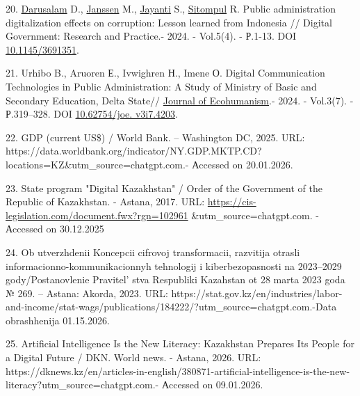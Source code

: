 \begin{refs}
20. \href{https://www.researchgate.net/scientific-contributions/Darusalam-Darusalam-2146395918?_tp=eyJjb250ZXh0Ijp7ImZpcnN0UGFnZSI6ImNpdGF0aW9uRG93bmxvYWQiLCJwYWdlIjoicHVibGljYXRpb24ifX0}{Darusalam}
D.,
\href{https://www.researchgate.net/profile/Marijn-Janssen?_tp=eyJjb250ZXh0Ijp7ImZpcnN0UGFnZSI6ImNpdGF0aW9uRG93bmxvYWQiLCJwYWdlIjoicHVibGljYXRpb24ifX0}{Janssen}
M.,
\href{https://www.researchgate.net/scientific-contributions/Sri-Delasmi-Jayanti-2236563283}{Jayanti}
S.,
\href{https://www.researchgate.net/scientific-contributions/Renato-Sitompul-2229051296?_tp=eyJjb250ZXh0Ijp7ImZpcnN0UGFnZSI6ImNpdGF0aW9uRG93bmxvYWQiLCJwYWdlIjoicHVibGljYXRpb24ifX0}{Sitompul}
R. Public administration digitalization effects on corruption: Lesson
learned from Indonesia // Digital Government: Research and Practice.-
2024. - Vol.5(4). - Р.1-13. DOI
\href{https://doi.org/10.1145/3691351}{10.1145/3691351}.

21. Urhibo B., Aruoren Е., Ivwighren Н., Imene О. Digital Communication
Technologies in Public Administration: A Study of Ministry of Basic and
Secondary Education, Delta State//
\href{https://www.researchgate.net/journal/Journal-of-Ecohumanism-2752-6801?_tp=eyJjb250ZXh0Ijp7ImZpcnN0UGFnZSI6ImNpdGF0aW9uRG93bmxvYWQiLCJwYWdlIjoicHVibGljYXRpb24ifX0}{Journal
of Ecohumanism}.- 2024. - Vol.3(7). - Р.319--328. DOI
\href{https://doi.org/10.62754/joe.v3i7.4203}{10.62754/joe. v3i7.4203}.

22. GDP (current US\$) / World Bank. -- Washington DC, 2025. URL:
https://data.worldbank.org/indicator/NY.GDP.MKTP.CD?locations=KZ\&utm\_source=chatgpt.com.-
Аccessed on 20.01.2026.

23. State program "Digital Kazakhstan" / Order of the Government of the
Republic of Kazakhstan. - Astana, 2017. URL:
\url{https://cis-legislation.com/document.fwx?rgn=102961}
\&utm\_source=chatgpt.com. - Аccessed on 30.12.2025

24. Ob utverzhdenii Koncepcii cifrovoj transformacii, razvitija otrasli
informacionno-kommunikacionnyh tehnologij i kiberbezopasnosti na
2023--2029 gody/Postanovlenie Pravitel' stva Respubliki
Kazahstan ot 28 marta 2023 goda № 269. -- Astana: Akorda, 2023. URL:
https://stat.gov.kz/en/industries/labor-and-income/stat-wags/publications/184222/?utm\_source=chatgpt.com.-Data
obrashhenija 01.15.2026.

25. Artificial Intelligence Is the New Literacy: Kazakhstan Prepares Its
People for a Digital Future / DKN. World news. - Astana, 2026. URL:
https://dknews.kz/en/articles-in-english/380871-artificial-intelligence-is-the-new-literacy?utm\_source=chatgpt.com.-
Аccessed on 09.01.2026.


\end{refs}
